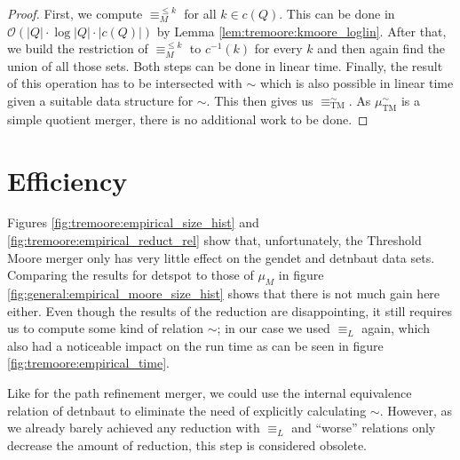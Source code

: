 \begin{proof}
	First, we compute $\equiv_M^{\leq k}$ for all $k \in c(Q)$. This can be done in $\mathcal{O}(|Q| \cdot \log |Q| \cdot |c(Q)|)$ by Lemma \ref{lem:tremoore:kmoore_loglin}. After that, we build the restriction of $\equiv_M^{\leq k}$ to $c^{-1}(k)$ for every $k$ and then again find the union of all those sets. Both steps can be done in linear time. Finally, the result of this operation has to be intersected with $\sim$ which is also possible in linear time given a suitable data structure for $\sim$. This then gives us $\equiv_\text{TM}^\sim$. As $\mu_\text{TM}^\sim$ is a simple quotient merger, there is no additional work to be done.
\end{proof}



\section{Efficiency}
Figures \ref{fig:tremoore:empirical_size_hist} and \ref{fig:tremoore:empirical_reduct_rel} show that, unfortunately, the Threshold Moore merger only has very little effect on the \textsf{gendet} and \textsf{detnbaut} data sets. Comparing the results for \textsf{detspot} to those of $\mu_M$ in figure \ref{fig:general:empirical_moore_size_hist} shows that there is not much gain here either. Even though the results of the reduction are disappointing, it still requires us to compute some kind of relation $\sim$; in our case we used $\equiv_L$ again, which also had a noticeable impact on the run time as can be seen in figure \ref{fig:tremoore:empirical_time}.

Like for the path refinement merger, we could use the internal equivalence relation of \textsf{detnbaut} to eliminate the need of explicitly calculating $\sim$. However, as we already barely achieved any reduction with $\equiv_L$ and \enquote{worse} relations only decrease the amount of reduction, this step is considered obsolete.


